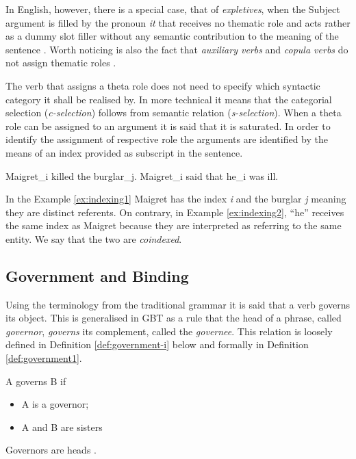 In English, however, there is a special case, that of \textit{expletives}, when the Subject argument is filled by the pronoun \textit{it} that receives no thematic role and acts rather as a dummy slot filler without any semantic contribution to the meaning of the sentence \citep[62]{Haegeman1991}. Worth noticing is also the fact that \textit{auxiliary verbs} and \textit{copula verbs} do not assign thematic roles \citep{pollock1989verb}. 

The verb that assigns a theta role does not need to specify which syntactic category it shall be realised by. In more technical it means that the categorial selection (\textit{c-selection}) follows from semantic relation (\textit{s-selection}). When a theta role can be assigned to an argument it is said that it is saturated. In order to identify the assignment of respective role the arguments are identified by the means of an index provided as subscript in the sentence. 

\begin{exe}
    \ex\label{ex:indexing1} Maigret_i killed the burglar_j.
    \ex\label{ex:indexing2} Maigret_i said that he_i was ill.
\end{exe}

In the Example \ref{ex:indexing1} Maigret has the index \textit{i} and the burglar \textit{j} meaning they are distinct referents. On contrary, in Example \ref{ex:indexing2}, ``he'' receives the same index as Maigret because they are interpreted as referring to the same entity. We say that the two are \textit{coindexed}.

\subsection{Government and Binding}

Using the terminology from the traditional grammar it is said that a verb governs its object. This is generalised in GBT as a rule that the head of a phrase, called \textit{governor}, \textit{governs} its complement, called the \textit{governee}. This relation is loosely defined in Definition \ref{def:government-i} below and formally in Definition \ref{def:government1}. 

\begin{definition}[government i]\label{def:government-i}
     A governs B if 
     \begin{itemize}
         \item A is a governor;
         \item A and B are sisters
     \end{itemize}
     Governors are heads \citep[86]{Haegeman1991}.
\end{definition}

